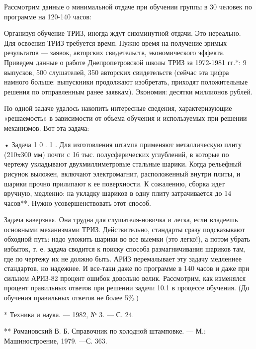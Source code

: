 Рассмотрим  данные  о минимальной  отдаче  при  обучении группы  в  30
человек по программе на 120-140 часов:



Организуя  обучение   ТРИЗ,  иногда   ждут  сиюминутной   отдачи.  Это
нереально. Для освоения ТРИЗ требуется время. Нужно время на получение
зримых  результатов —  заявок, авторских  свидетельств, экономического
эффекта.  Приведем  данные о  работе  Днепропетровской  школы ТРИЗ  за
1972-1981 гг.*: 9 выпусков, 500 слушателей, 350 авторских свидетельств
(сейчас эта  цифра намного  больше: выпускники  продолжают изобретать,
приходят  положительные   решения  по  отправленным   ранее  заявкам).
Экономия: десятки миллионов рублей.


По одной задаче удалось  накопить интересные сведения, характеризующие
«решаемость»  в  зависимости от  объема  обучения  и используемых  при
решении механизмов. Вот эта задача:

• Задача  1 0 .  1 .  Для изготовления штампа  применяют металлическую
плиту  (210x300 мм)  почти  с 16  тыс.  полусферических углублений,  в
которые  по  чертежу  укладывают  двухмиллиметровые  стальные  шарики.
Когда рельефный рисунок выложен, включают электромагнит, расположенный
внутри плиты, и шарики прочно прилипают к ее поверхности. К сожалению,
сборка  идет  вручную,  медленно:  на укладку  шариков  в  одну  плиту
затрачивается до 14 часов**. Нужно усовершенствовать этот способ.

Задача  каверзная.  Она трудна  для  слушателя-новичка  и легка,  если
владеешь  основными механизмами  ТРИЗ. Действительно,  стандарты сразу
подсказывают обходной  путь: надо  уложить шарики  во все  выемки (это
легко!),  а потом  убрать  избыток,  т. е.  задача  сводится к  поиску
способа размагничивания шариков там, где по чертежу их не должно быть.
АРИЗ  перемалывает эту  задачу  медленнее стандартов,  но надежнее.  И
все-таки даже  по программе  в 140  часов и  даже при  сильном АРИЗ-82
процент  ошибок  довольно  велик. Рассмотрим,  как  изменялся  процент
правильных ответов  при решении задачи  10.1 в процессе  обучения. (До
обучения правильных ответов не более 5\%.)

* Техника и наука. — 1982, № 3. — С. 24.

**  Романовский  В.  Б.  Справочник   по  холодной  штамповке.  —  М.:
Машиностроение, 1979. —С. 363.


